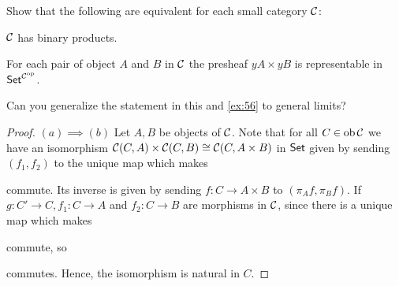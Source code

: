 \begin{exercise}{57}
    Show that the following are equivalent for each small category $\mathcal{C}$:
    \begin{equivalent}
        \item $\mathcal{C}$ has binary products.
        \item For each pair of object $A$ and $B$ in $\mathcal{C}$ the presheaf $yA\times yB$ is representable in ${\normalfont\mathsf{Set}}^{{\mathcal{C}}^{\text{op}}}$.
    \end{equivalent}
    Can you generalize the statement in this and \ref{ex:56} to general limits?
\end{exercise}
\begin{solution}
    \begin{proof}
        $(a)\implies (b)$ Let $A,B$ be objects of $\mathcal{C}$. Note that for all $C\in\operatorname{ob}\mathcal{C}$ we have an isomorphism $\mathcal{C}(C,A)\times \mathcal{C}(C,B)\cong \mathcal{C}(C, A\times B)$ in $\normalfont\mathsf{Set}$ given by sending $(f_1,f_2)$ to the unique map which makes 
        commute. Its inverse is given by sending $f\colon C\to A\times B$ to $(\pi_A f,\pi_B f)$. 
        If $g\colon C'\to C, f_1\colon C\to A$ and $f_2\colon C\to B$ are morphisms in $\mathcal{C}$, since there is a unique map which makes
        commute, so 
        commutes. Hence, the isomorphism is natural in $C$.


\end{proof}
\end{solution}
